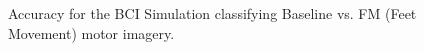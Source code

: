 \documentclass[11pt]{beamer}
\begin{document}
	
	\begin{frame}
   \begin{figure}[thpb]
      \centering
      \setlength\fboxsep{0pt}
	  \setlength\fboxrule{0.5pt}
      \caption{\centering Accuracy for the BCI Simulation classifying Baseline vs. FM (Feet Movement) motor imagery.}
      \label{figure3}
   \end{figure} 	
	\end{frame}	  
    
\end{document}
